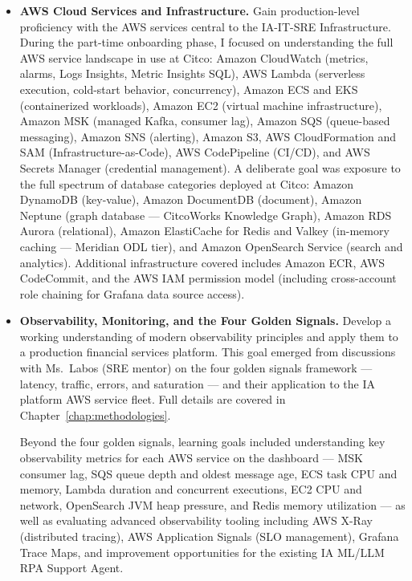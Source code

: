 \begin{itemize}

    \item \textbf{AWS Cloud Services and Infrastructure.}
          Gain production-level proficiency with the AWS services central
          to the IA-IT-SRE Infrastructure. During the part-time onboarding
          phase, I focused on understanding the full AWS service landscape
          in use at Citco: Amazon CloudWatch (metrics, alarms, Logs Insights,
          Metric Insights SQL), AWS Lambda (serverless execution, cold-start
          behavior, concurrency), Amazon ECS and EKS (containerized
          workloads), Amazon EC2 (virtual machine infrastructure),
          Amazon MSK (managed Kafka, consumer lag), Amazon SQS
          (queue-based messaging), Amazon SNS (alerting), Amazon S3,
          AWS CloudFormation and SAM (Infrastructure-as-Code), AWS
          CodePipeline (CI/CD), and AWS Secrets Manager (credential
          management). A deliberate goal was exposure to the full spectrum
          of database categories deployed at Citco: Amazon DynamoDB
          (key-value), Amazon DocumentDB (document), Amazon Neptune
          (graph database --- CitcoWorks Knowledge Graph), Amazon RDS
          Aurora (relational), Amazon ElastiCache for Redis and Valkey
          (in-memory caching --- Meridian ODL tier), and Amazon OpenSearch
          Service (search and analytics). Additional infrastructure covered
          includes Amazon ECR, AWS CodeCommit, and the AWS IAM permission
          model (including cross-account role chaining for Grafana
          data source access).

    \item \textbf{Observability, Monitoring, and the Four Golden Signals.}
          Develop a working understanding of modern observability principles
          and apply them to a production financial services platform. This
          goal emerged from discussions with Ms.\ Labos (SRE mentor) on
          the four golden signals framework --- latency, traffic, errors,
          and saturation --- and their application to the IA platform AWS
          service fleet. Full details are covered in
          Chapter~\ref{chap:methodologies}.

          Beyond the four golden signals, learning goals included
          understanding key observability metrics for each AWS service
          on the dashboard --- MSK consumer lag, SQS queue depth and
          oldest message age, ECS task CPU and memory, Lambda duration
          and concurrent executions, EC2 CPU and network, OpenSearch
          JVM heap pressure, and Redis memory utilization --- as well as
          evaluating advanced observability tooling including AWS X-Ray
          (distributed tracing), AWS Application Signals (SLO management),
          Grafana Trace Maps, and improvement opportunities for the
          existing IA ML/LLM RPA Support Agent.


\end{itemize}
